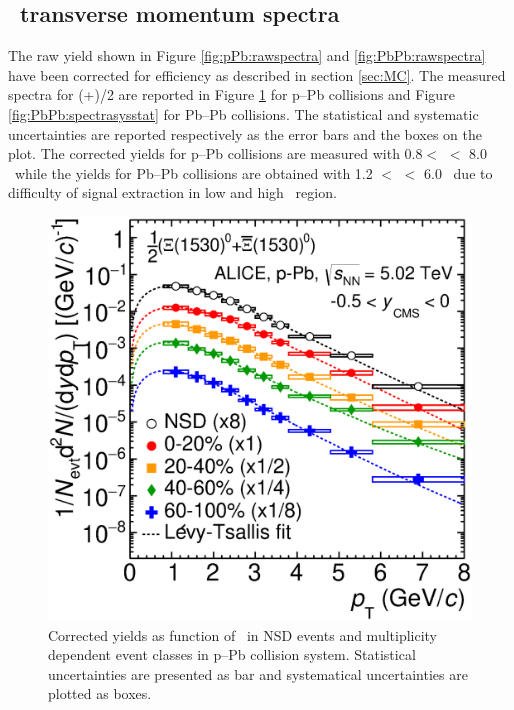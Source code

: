 \newpage
\subsection{\xis~transverse momentum spectra}\label{sec:pPb:spectra} 
The raw yield shown in Figure \ref{fig:pPb:rawspectra} and \ref{fig:PbPb:rawspectra} have been corrected for efficiency as described in section \ref{sec:MC}. The measured spectra for (\xis+\xisb)/2 are reported in Figure \ref{fig:pPb:spectrasysstat} for p--Pb collisions and Figure \ref{fig:PbPb:spectrasysstat} for Pb--Pb collisions. The statistical and systematic uncertainties are reported respectively as the error bars and the boxes on the plot. The corrected yields for p--Pb collisions are measured with  0.8$<$ \pt $<$ 8.0 \gmom~while the yields for Pb--Pb collisions are obtained with 1.2 $<$ \pt $<$ 6.0 \gmom~due to difficulty of signal extraction in low and high \pt~region. 

\begin{figure}[htbp]
\begin{center}
\includegraphics[width=12.0cm]{./Version1/FigChapter5/Spectra/SpectraStatSyspPb.eps}
\caption{Corrected yields as function of \pt~in NSD events and multiplicity dependent event classes in p--Pb collision system. Statistical uncertainties are presented as bar and systematical uncertainties are plotted as boxes.} 
\label{fig:pPb:spectrasysstat}
\end{center}
\end{figure}


